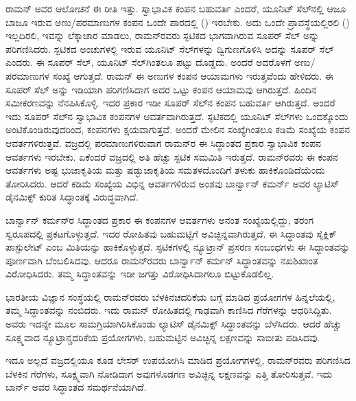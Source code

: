 ರಾಮನ್ ಅವರ ಆಲೋಚನೆ ಈ ರೀತಿ ಇತ್ತು. ಸ್ವಾಭಾವಿಕ ಕಂಪನ ಬಹುವರ್ತಿ ಎಂದರೆ, ಯೂನಿಟ್ ಸೆಲ್‍ನಲ್ಲಿ ಆಜೂ ಬಾಜೂ ಇರುವ ಅಣು/ಪರಮಾಣುಗಳ ಕಂಪನ ಒಂದೇ ಪಾರದಲ್ಲಿ () ಇರಬೇಕು. ಅದು ಒಂದೇ ಪ್ರಾವಸ್ಥೆಯಲ್ಲಿರಲಿ () ಇಲ್ಲದಿರಲಿ, ಇವನ್ನು ಲೆಕ್ಕಾಚಾರ ಮಾಡಲು, ರಾಮನ್‍ರವರು ಸ್ಫಟಿಕದ ಭಾಗವಾಗಿರುವ ಸೂಪರ್ ಸೆಲ್ ಅನ್ನು ಪರಿಗಣಿಸಿದರು. ಸ್ಫಟಿಕದ ಅಂಚುಗಳಲ್ಲಿ ಇರುವ ಯೂನಿಟ್ ಸೆಲ್‍ಗಳನ್ನು ದ್ವಿಗುಣಗೊಳಿಸಿ ಅದನ್ನು ಸೂಪರ್ ಸೆಲ್ ಎಂದರು. ಈ ಸೂಪರ್ ಸೆಲ್, ಯೂನಿಟ್ ಸೆಲ್‍ಗಿಂತಲೂ  ಪಟ್ಟು ದೊಡ್ಡದು. ಅಂದರೆ ಅದರೊಳಗೆ ಅಣು/ಪರಮಾಣುಗಳ ಸಂಖ್ಯೆ  ಆಗುತ್ತದೆ. ರಾಮನ್ ಈ  ಅಣುಗಳ ಕಂಪನ ಆಯಾಮಗಳು  ಇರುತ್ತವೆಂದು ಹೇಳಿದರು. ಈ ಸೂಪರ್ ಸೆಲ್ ಅನ್ನು ಇಡಿಯಾಗಿ ಪರಿಗಣಿಸಿದಾಗ ಅದರ ಒಟ್ಟು ಕಂಪನ ಆಯಾಮವು  ಆಗಿರುತ್ತದೆ. ಹಿಂದಿನ ಸಮೀಕರಣವನ್ನು ನೆನಪಿಸಿಕೊಳ್ಳಿ. ಇದರ ಪ್ರಕಾರ ಇಡೀ ಸೂಪರ್ ಸೆಲ್‍ನ ಕಂಪನ ಬಹುವರ್ತಿ  ಆಗಿರುತ್ತದೆ. ಅಂದರೆ ಇದು ಸೂಪರ್ ಸೆಲ್‍ನ ಸ್ವಾಭಾವಿಕ ಕಂಪನಗಳ ಆವರ್ತವಾಗಿರುತ್ತದೆ. ಸ್ಫಟಿಕದಲ್ಲಿ ಯೂನಿಟ್ ಸೆಲ್‍ಗಳು ಒಂದಕ್ಕೊಂದು ಅಂಟಿಕೊಂಡಿರುವುದರಿಂದ, ಕಂಪನಗಳು ಕ್ಷಯವಾಗುತ್ತವೆ. ಅಂದರೆ ಮೇಲಿನ ಸಂಖ್ಯೆಗಿಂತಲೂ ಕಡಿಮೆ ಸಂಖ್ಯೆಯ ಕಂಪನ ಆವರ್ತಗಳಿರುತ್ತವೆ. ವಜ್ರದಲ್ಲಿ  ಪರಮಾಣುಗಳಿರುವಾಗ ರಾಮನ್‍ರ ಈ ಸಿದ್ಧಾಂತದ ಪ್ರಕಾರ  ಸ್ವಾಭಾವಿಕ ಕಂಪನ ಆವರ್ತಗಳು ಇರಬೇಕು. ಏಕೆಂದರೆ ವಜ್ರದಲ್ಲಿ ಅತಿ ಹೆಚ್ಚು ಸ್ಫಟಿಕ ಸಮಮಿತಿ ಇರುತ್ತದೆ. ರಾಮನ್‍ರವರು ಈ ಕಂಪನ ಆವರ್ತಗಳು ಅಷ್ಟ ಭುಜಾಕೃತಿಯ ಮತ್ತು ಷಡ್ಭುಜಾಕೃತಿಯ ಸಮತಳದೊಂದಿಗೆ ತಳುಕು ಹಾಕಿಕೊಂಡಿದೆಯೆಂದು ತೋರಿಸಿದರು. ಆದರೆ ಕಡಿಮೆ ಸಂಖ್ಯೆಯ ವಿಭಿನ್ನ ಆವರ್ತಗಳಿರುವ ಅಂಶವು ಬಾರ್ನ್\enginline{--}ವಾನ್ ಕಮರ್ನ್ ಅವರ ಲ್ಯಾಟಿಸ್ ಡೈನಮಿಕ್ಸ್ ಕುರಿತ ಸಿದ್ಧಾಂತಕ್ಕೆ ವಿರುದ್ಧವಾಗಿದೆ.

ಬಾರ್ನ್\enginline{--}ವಾನ್ ಕರ್ಮನ್‍ರ ಸಿದ್ಧಾಂತದ ಪ್ರಕಾರ ಈ ಕಂಪನಗಳ ಆವರ್ತಗಳು ಅನಂತ ಸಂಖ್ಯೆಯಲ್ಲಿದ್ದು, ತರಂಗ ಸ್ವರೂಪದಲ್ಲಿ ಪ್ರಕಟಗೊಳ್ಳುತ್ತದೆ. ಇದರ ರೋಹಿತವು ಬಹುಮಟ್ಟಿಗೆ ಅವಿಚ್ಛಿನ್ನವಾಗಿರುತ್ತದೆ. ಈ ಸಿದ್ಧಾಂತವು ಸೈಕ್ಲಿಕ್ ಪಾಸ್ಟುಲೇಟ್ ಎಂಬ ಮಿತಿಯನ್ನು ಹಾಕಿಕೊಳ್ಳುತ್ತದೆ. ಸ್ಫಟಿಕಗಳಲ್ಲಿ ನ್ಯೂಟ್ರಾನ್ ಪ್ರಸರಣ ಸಂಬಂಧಗಳು ಈ ಸಿದ್ಧಾಂತವನ್ನು ಪೂರ್ಣವಾಗಿ ಬೆಂಬಲಿಸಿದವು. ಆದರೂ ರಾಮನ್‍ರವರು ಬಾರ್ನ್\enginline{--}ವಾನ್ ಕರ್ಮನ್ ಸಿದ್ಧಾಂತವನ್ನು ನಖಶಿಖಾಂತ ವಿರೋಧಿಸಿದರು. ತಮ್ಮ ಸಿದ್ಧಾಂತವನ್ನು ಇಡೀ ಜಗತ್ತು ವಿರೋಧಿಸಿದಾಗಲೂ ಬಿಟ್ಟುಕೊಡಲಿಲ್ಲ.

ಭಾರತೀಯ ವಿಜ್ಞಾನ ಸಂಸ್ಥೆಯಲ್ಲಿ ರಾಮನ್‍ರವರು ಬೆಳಕಿನ\enginline{-}ಚದರಿಕೆಯ ಬಗ್ಗೆ ಮಾಡಿದ ಪ್ರಯೋಗಗಳ ಹಿನ್ನಲೆಯಲ್ಲಿ, ತಮ್ಮ ಸಿದ್ಧಾಂತವನ್ನು ನಂಬಿದರು. ಇದು ರಾಮನ್ ರೋಹಿತದಲ್ಲಿ\break {} ಗಾಢವಾಗಿ ಕಾಣಿಸಿದ ಗೆರೆಗಳನ್ನು ಆಧರಿಸಿದ್ದಿತು. ಅವರು ಇದನ್ನೇ ಮೂಲ ಸಾಮಗ್ರಿಯಾಗಿರಿಸಿಕೊಂಡು ಲ್ಯಾಟಿಸ್ ಡೈನಮಿಕ್ಸ್ ಸಿದ್ಧಾಂತವನ್ನು ಬೆಳೆಸಿದರು. ಆದರೆ ಹೆಚ್ಚು ಸೂಕ್ಷ್ಮವಾದ ನ್ಯೂಟ್ರಾನ್\enginline{-}ಚದರಿಕೆಯ ಪ್ರಯೋಗಗಳು, ಬಹುಮಟ್ಟಿನ ಅವಿಚ್ಛಿನ್ನ ಲಕ್ಷಣವನ್ನು ಸಾಬೀತು ಪಡಿಸಿದವು.

ಇದೂ ಅಲ್ಲದೆ ವಜ್ರದಲ್ಲಿಯೂ ಕೂಡ ಲೇಸರ್ ಉಪಯೋಗಿಸಿ ಮಾಡಿದ ಪ್ರಯೋಗಗಳಲ್ಲಿ, ರಾಮನ್‍ರವರು ಪರಿಗಣಿಸಿದ ಬೆಳಕಿನ ಗೆರೆಗಳು, ಸೂಕ್ಷ್ಮವಾಗಿ ನೋಡಿದಾಗ ಅವುಗಳೊಡಗಣ ಅವಿಚ್ಛಿನ್ನ ಲಕ್ಷಣವನ್ನು ಎತ್ತಿ ತೋರಿಸುತ್ತವೆ. ಇದು ಬಾರ್ನ್ ಅವರ ಸಿದ್ಧಾಂತದ ಸಮರ್ಥನೆಯಾಗಿದೆ.

